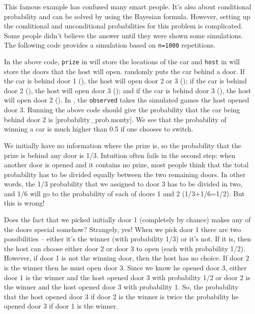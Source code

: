 This famous example has confused many smart people. It's also about conditional
probability and can be solved by using the Bayesian formula. However, setting up
the conditional and unconditional probabilities for this problem is
complicated. Some people didn't believe the answer until they were shown some
simulations. The following code provides a simulation based on \lstinline{n=1000}
repetitions.   


In the above code, \lstinline{prize} in  will store the locations of the
car and \lstinline{host} in  will store the doors that the host will
open.   randomly puts the car behind a door.  If the car is behind
door 1 (), the host will open door 2 or 3 (); if the car
is behind door 2 (), the host will open door 3 (); and
if the car is behind door 3 (), the host will open door 2
().  In , the \lstinline{observed} takes the simulated games
the host opened door 3.
Running the above code should give the probability that the car being behind
door 2 is [probability_prob.monty].
We see that the probability of winning a car is much higher than 0.5 if one
chooses to switch.

We initially have no information where the prize is, so the probability that the
prize is behind any door is 1/3. Intuition often fails in the second step: when
another door is opened and it contains no prize, most people think that the
total probability has to be divided equally between the two remaining doors. In
other words, the 1/3 probability that we assigned to door 3 has to be divided in
two, and 1/6 will go to the probability of each of doors 1 and 2
(1/3+1/6=1/2). But this is wrong!

Does the fact that we picked initially door 1 (completely by chance) makes any
of the doors special somehow? Strangely, yes!  When we pick door 1 there are two
possibilities -- either it's the winner (with probability 1/3) or it's not. If
it is, then the host can choose either door 2 or door 3 to open (each with
probability 1/2). However, if door 1 is not the winning door, then the host has
no choice. If door 2 is the winner then he must open door 3.  Since we know he
opened door 3, either door 1 is the winner and the host opened door 3 with
probability 1/2 or door 2 is the winner and the host opened door 3 with
probability 1. So, the probability that the host opened door 3 if door 2 is the
winner is twice the probability he opened door 3 if door 1 is the winner.

